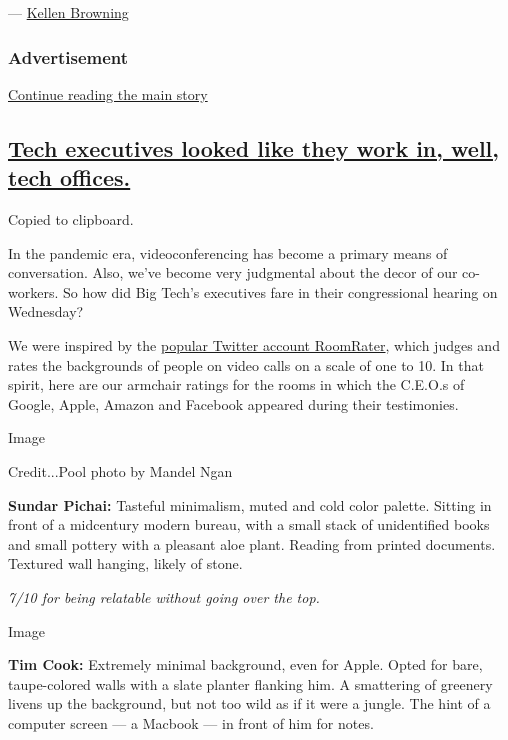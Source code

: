 --- \href{https://www.nytimes3xbfgragh.onion/by/kellen-browning}{Kellen
Browning}

\hypertarget{advertisement-2}{%
\subsubsection{Advertisement}\label{advertisement-2}}

\protect\hyperlink{after-dfp-ad-mid3}{Continue reading the main story}

\hypertarget{tech-executives-looked-like-they-work-in-well-tech-offices}{%
\subsection{\texorpdfstring{\protect\hyperlink{tech-executives-looked-like-they-work-in-well-tech-offices}{Tech
executives looked like they work in, well, tech
offices.}}{Tech executives looked like they work in, well, tech offices.}}\label{tech-executives-looked-like-they-work-in-well-tech-offices}}

Copied to clipboard.

In the pandemic era, videoconferencing has become a primary means of
conversation. Also, we've become very judgmental about the decor of our
co-workers. So how did Big Tech's executives fare in their congressional
hearing on Wednesday?

We were inspired by the
\href{https://slack-redir.net/link?url=https\%3A\%2F\%2Ftwitter.com\%2Fratemyskyperoom}{popular
Twitter account RoomRater}, which judges and rates the backgrounds of
people on video calls on a scale of one to 10. In that spirit, here are
our armchair ratings for the rooms in which the C.E.O.s of Google,
Apple, Amazon and Facebook appeared during their testimonies.

Image

Credit...Pool photo by Mandel Ngan

\textbf{Sundar Pichai:} Tasteful minimalism, muted and cold color
palette. Sitting in front of a midcentury modern bureau, with a small
stack of unidentified books and small pottery with a pleasant aloe
plant. Reading from printed documents. Textured wall hanging, likely of
stone.

\emph{7/10 for being relatable without going over the top.}

Image

\textbf{Tim Cook:} Extremely minimal background, even for Apple. Opted
for bare, taupe-colored walls with a slate planter flanking him. A
smattering of greenery livens up the background, but not too wild as if
it were a jungle. The hint of a computer screen --- a Macbook --- in
front of him for notes.

